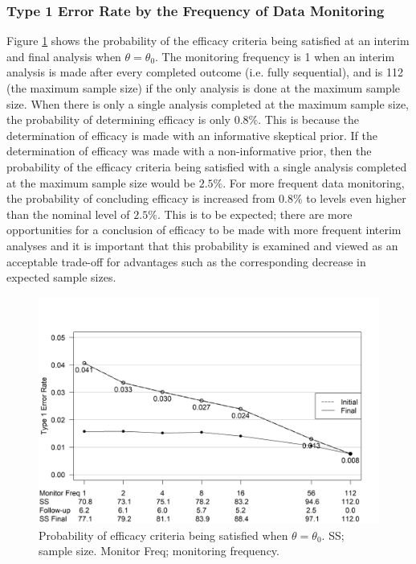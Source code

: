 \documentclass[useAMS,usenatbib,referee]{biom}
\begin{document}
\subsubsection{Type 1 Error Rate by the Frequency of Data Monitoring}\label{sec:ex1t1e}
Figure \ref{fig:ex1t1e} shows the probability of the efficacy criteria being satisfied at an interim and final analysis when $\theta=\theta_0$. 
%
The monitoring frequency is 1 when an interim analysis is made after every completed outcome (i.e. fully sequential), and is 112 (the maximum sample size) if the only analysis is done at the maximum sample size.
%
When there is only a single analysis completed at the maximum sample size, the probability of determining efficacy is only $0.8\%$.
%
This is because the determination of efficacy is made with an informative skeptical prior.
%
If the determination of efficacy was made with a non-informative prior, then the probability of the efficacy criteria being satisfied with a single analysis completed at the maximum sample size would be $2.5\%$.
%
For more frequent data monitoring, the probability of concluding efficacy is increased from $0.8\%$ to levels even higher than the nominal level of $2.5\%$.
%
This is to be expected; there are more opportunities for a conclusion of efficacy to be made with more frequent interim analyses and it is important that this probability is examined and viewed as an acceptable trade-off for advantages such as the corresponding decrease in expected sample sizes.
\begin{figure}\begin{center}

    \includegraphics[width=6in]{figure4.png}
    \caption{Probability of efficacy criteria being satisfied when $\theta=\theta_0$. SS; sample size. Monitor Freq; monitoring frequency.}
	\label{fig:ex1t1e}

 
\end{center}
\end{figure}
\end{document}
